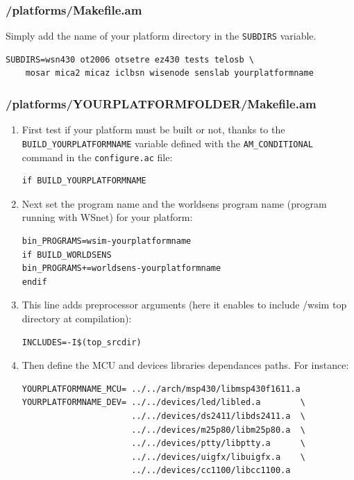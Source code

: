 \documentclass[a4paper,10pt]{report}
\begin{document}
\subsubsection{/platforms/Makefile.am}
Simply add the name of your platform directory in the \verb$SUBDIRS$ variable.
\begin{verbatim}
SUBDIRS=wsn430 ot2006 otsetre ez430 tests telosb \
	mosar mica2 micaz iclbsn wisenode senslab yourplatformname
\end{verbatim}

\subsubsection{/platforms/YOURPLATFORMFOLDER/Makefile.am}
\label{yourplatformmakefile}
\begin{enumerate}
  \item First test if your platform must be built or not, thanks to the \verb$BUILD_YOURPLATFORMNAME$ variable defined with the \verb$AM_CONDITIONAL$ command in the \verb$configure.ac$ file: 
\begin{verbatim}
if BUILD_YOURPLATFORMNAME
\end{verbatim}

 \item  Next set the program name and the worldsens program name (program running with WSnet) for your platform:
\begin{verbatim}
bin_PROGRAMS=wsim-yourplatformname
if BUILD_WORLDSENS
bin_PROGRAMS+=worldsens-yourplatformname
endif
\end{verbatim}

  \item This line adds preprocessor arguments (here it enables to include /wsim top directory at compilation):
\begin{verbatim}
INCLUDES=-I$(top_srcdir)
\end{verbatim}

  \item Then define the MCU and devices libraries dependances paths. For instance:
\begin{verbatim}
YOURPLATFORMNAME_MCU= ../../arch/msp430/libmsp430f1611.a
YOURPLATFORMNAME_DEV= ../../devices/led/libled.a        \
                      ../../devices/ds2411/libds2411.a  \
                      ../../devices/m25p80/libm25p80.a  \
                      ../../devices/ptty/libptty.a      \
                      ../../devices/uigfx/libuigfx.a    \
                      ../../devices/cc1100/libcc1100.a
\end{verbatim}


\end{enumerate}
\end{document}
